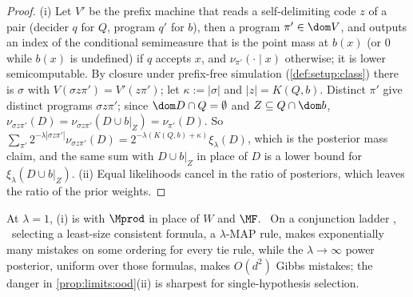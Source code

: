 \begin{proof}
(i) Let $V'$ be the prefix machine that reads a self-delimiting code $z$ of a pair (decider $q$ for $Q$, program $q'$ for $b$), then a program $\pi'\in\dom V$, and outputs an index of the conditional semimeasure that is the point mass at $b(x)$ (or $0$ while $b(x)$ is undefined) if $q$ accepts $x$, and $\nu_{\pi'}(\cdot\mid x)$ otherwise; it is lower semicomputable. By closure under prefix-free simulation (\cref{def:setup:class}) there is $\sigma$ with $V(\sigma z\pi')=V'(z\pi')$; let $\kappa:=|\sigma|$ and $|z|=K(Q,b)$. Distinct $\pi'$ give distinct programs $\sigma z\pi'$; since $\dom D\cap Q=\emptyset$ and $Z\subseteq Q\cap\dom b$, $\nu_{\sigma z\pi'}(D)=\nu_{\sigma z\pi'}(D\cup b|_Z)=\nu_{\pi'}(D)$. So $\sum_{\pi'}2^{-\lambda|\sigma z\pi'|}\nu_{\sigma z\pi'}(D)=2^{-\lambda(K(Q,b)+\kappa)}\xi_\lambda(D)$, which is the posterior mass claim, and the same sum with $D\cup b|_Z$ in place of $D$ is a lower bound for $\xi_\lambda(D\cup b|_Z)$. (ii) Equal likelihoods cancel in the ratio of posteriors, which leaves the ratio of the prior weights.
\end{proof}

At $\lambda=1$, (i) is \citet[Proposition~8.1(a)]{claudeSFI2026fundamentals} with $\Mprod$ in place of $W$ and $\MF$.%
\ On a conjunction ladder \citep[Theorem~9.10 and Remark~G.11]{claudeSFI2026fundamentals},%
\ selecting a least-size consistent formula, a $\lambda$-MAP rule, makes exponentially many mistakes on some ordering for every tie rule, while the $\lambda\to\infty$ power posterior, uniform over those formulas, makes $O(d^2)$ Gibbs mistakes; the danger in \cref{prop:limits:ood}(ii) is sharpest for single-hypothesis selection.
